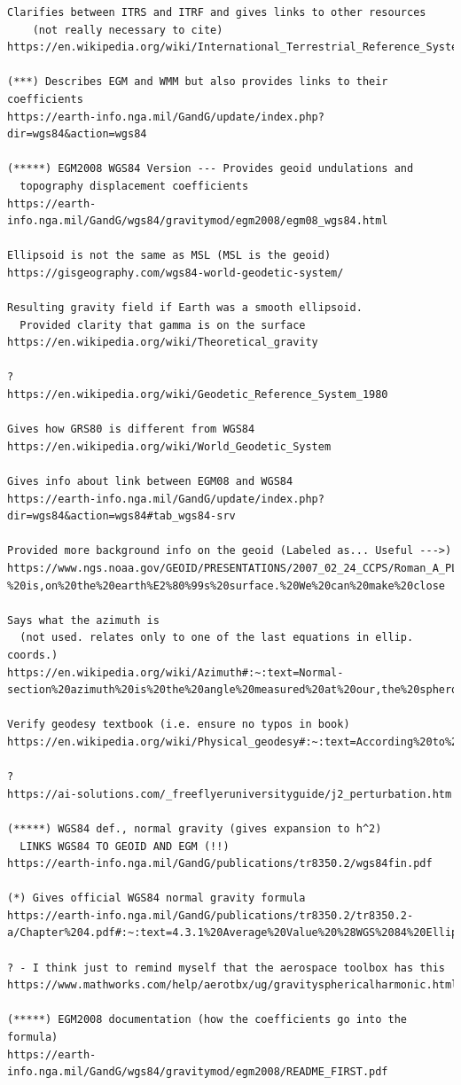 \documentclass[11pt,dvipsnames]{thesis}
\begin{document}
\begin{verbatim}
Clarifies between ITRS and ITRF and gives links to other resources
  	(not really necessary to cite)
https://en.wikipedia.org/wiki/International_Terrestrial_Reference_System_and_Frame

(***) Describes EGM and WMM but also provides links to their coefficients
https://earth-info.nga.mil/GandG/update/index.php?dir=wgs84&action=wgs84

(*****) EGM2008 WGS84 Version --- Provides geoid undulations and 
  topography displacement coefficients
https://earth-info.nga.mil/GandG/wgs84/gravitymod/egm2008/egm08_wgs84.html

Ellipsoid is not the same as MSL (MSL is the geoid)
https://gisgeography.com/wgs84-world-geodetic-system/

Resulting gravity field if Earth was a smooth ellipsoid.
  Provided clarity that gamma is on the surface
https://en.wikipedia.org/wiki/Theoretical_gravity

?
https://en.wikipedia.org/wiki/Geodetic_Reference_System_1980

Gives how GRS80 is different from WGS84
https://en.wikipedia.org/wiki/World_Geodetic_System

Gives info about link between EGM08 and WGS84
https://earth-info.nga.mil/GandG/update/index.php?dir=wgs84&action=wgs84#tab_wgs84-srv

Provided more background info on the geoid (Labeled as... Useful --->)
https://www.ngs.noaa.gov/GEOID/PRESENTATIONS/2007_02_24_CCPS/Roman_A_PLSC2007notes.pdf#:~:text=Plumb%20line%20%28over%20exaggerated%20in%20drawing%29%20-%20is,on%20the%20earth%E2%80%99s%20surface.%20We%20can%20make%20close

Says what the azimuth is
  (not used. relates only to one of the last equations in ellip. coords.)
https://en.wikipedia.org/wiki/Azimuth#:~:text=Normal-section%20azimuth%20is%20the%20angle%20measured%20at%20our,the%20spheroid%20from%20our%20viewpoint%20to%20Point%202.

Verify geodesy textbook (i.e. ensure no typos in book)
https://en.wikipedia.org/wiki/Physical_geodesy#:~:text=According%20to%20the%20famous%20Bruns%20formula%2C%20we%20have,Stokes%20published%20the%20following%20formula%20named%20after%20him%3A

?
https://ai-solutions.com/_freeflyeruniversityguide/j2_perturbation.htm

(*****) WGS84 def., normal gravity (gives expansion to h^2)
  LINKS WGS84 TO GEOID AND EGM (!!)
https://earth-info.nga.mil/GandG/publications/tr8350.2/wgs84fin.pdf

(*) Gives official WGS84 normal gravity formula
https://earth-info.nga.mil/GandG/publications/tr8350.2/tr8350.2-a/Chapter%204.pdf#:~:text=4.3.1%20Average%20Value%20%28WGS%2084%20Ellipsoid%29%20A%20number,WGS%2084%20Ellipsoid%20is%20Y%20%3D%20979764.46561%20milligals.

? - I think just to remind myself that the aerospace toolbox has this
https://www.mathworks.com/help/aerotbx/ug/gravitysphericalharmonic.html

(*****) EGM2008 documentation (how the coefficients go into the formula)
https://earth-info.nga.mil/GandG/wgs84/gravitymod/egm2008/README_FIRST.pdf
\end{verbatim}
\end{document}
